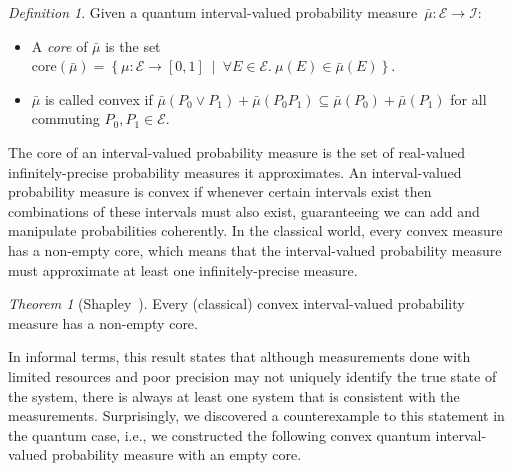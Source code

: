 \documentclass{article}
\theoremstyle{remark}
\newtheorem{definition}{Definition}
\newtheorem{thm}{Theorem}
\newcommand{\events}{\ensuremath{\mathcal{E}}}
\newcommand{\pmeas}{\ensuremath{\mu}}
\begin{document}
\begin{definition}
  Given a quantum interval-valued probability
  measure~$\bar{\mu}:\events\rightarrow\mathscr{I}$:
\begin{itemize}
\item A \emph{core} of $\bar{\mu}$ is the set
  $\mathrm{core}\left(\bar{\mu}\right)=\left\{
    \pmeas:\events\rightarrow[0,1] ~\middle|~ \forall
    E\in\events.~\pmeas\left(E\right)\in\bar{\mu}\left(E\right)\right\}$.
\item $\bar{\mu}$ is called convex if
  $\bar{\mu}\left(P_{0}\vee
    P_{1}\right)+\bar{\mu}\left(P_{0}P_{1}\right)\subseteq\bar{\mu}\left(P_{0}\right)+\bar{\mu}\left(P_{1}\right)$
  for all commuting $P_{0},P_{1}\in\events$.
\end{itemize}
\end{definition}

\noindent The core of an interval-valued probability measure is the
set of real-valued infinitely-precise probability measures it
approximates. An interval-valued probability measure is convex if
whenever certain intervals exist then combinations of these intervals
must also exist, guaranteeing we can add and manipulate probabilities
coherently. In the classical world, every convex measure has a
non-empty core, which means that the interval-valued probability
measure must approximate at least one infinitely-precise measure.

\begin{thm}[Shapley~\cite{Shapley1971}]\label{thm:Shapley}
  Every (classical) convex interval-valued probability measure has a
  non-empty core.
\end{thm}

In informal terms, this result states that although measurements done
with limited resources and poor precision may not uniquely identify
the true state of the system, there is always at least one system that
is consistent with the measurements. Surprisingly, we discovered a
counterexample to this statement in the quantum case, i.e., we
constructed the following convex quantum interval-valued probability
measure with an empty core.
\end{document}
